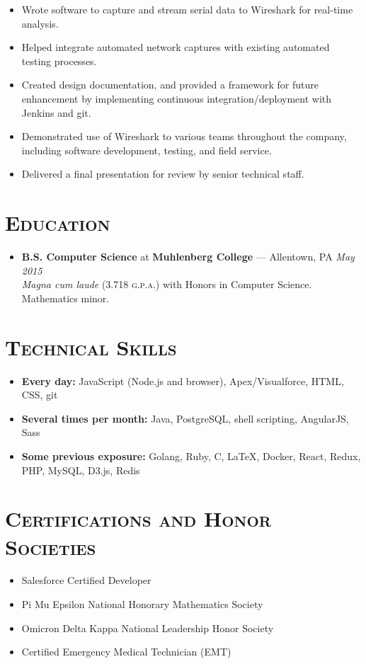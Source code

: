 \documentclass[11pt]{article}
\begin{document}
\begin{itemize}
\begin{itemize}
      \item Wrote software to capture and stream serial data to Wireshark for real-time analysis.
      \item Helped integrate automated network captures with existing automated testing processes.
      \item Created design documentation, and provided a framework for future enhancement by implementing continuous integration/deployment with Jenkins and git.
      \item Demonstrated use of Wireshark to various teams throughout the company, including software development, testing, and field service.
      \item Delivered a final presentation for review by senior technical staff.
    \end{itemize}
\end{itemize}



\section*{\textsc{Education}}
\begin{itemize}
  \item \textbf{B.S. Computer Science} at \textbf{Muhlenberg College} --- Allentown, PA \hfill {\em May 2015} \\
    {\em Magna cum laude} (3.718 \textsc{g.p.a.}) with Honors in Computer Science. Mathematics minor.
\end{itemize}



\section*{\textsc{Technical Skills}}
\begin{itemize}
  \item \textbf{Every day:} JavaScript (Node.js and browser), Apex/Visualforce, HTML, CSS, git
  \item \textbf{Several times per month:} Java, PostgreSQL, shell scripting, AngularJS, Sass
  \item \textbf{Some previous exposure:} Golang, Ruby, C, LaTeX, Docker, React, Redux, PHP, MySQL, D3.js, Redis
\end{itemize}



\section*{\textsc{Certifications and Honor Societies}}
\begin{itemize}
  \item Salesforce Certified Developer
  \item Pi Mu Epsilon National Honorary Mathematics Society
  \item Omicron Delta Kappa National Leadership Honor Society
  \item Certified Emergency Medical Technician (EMT)
\end{itemize}
\end{document}
